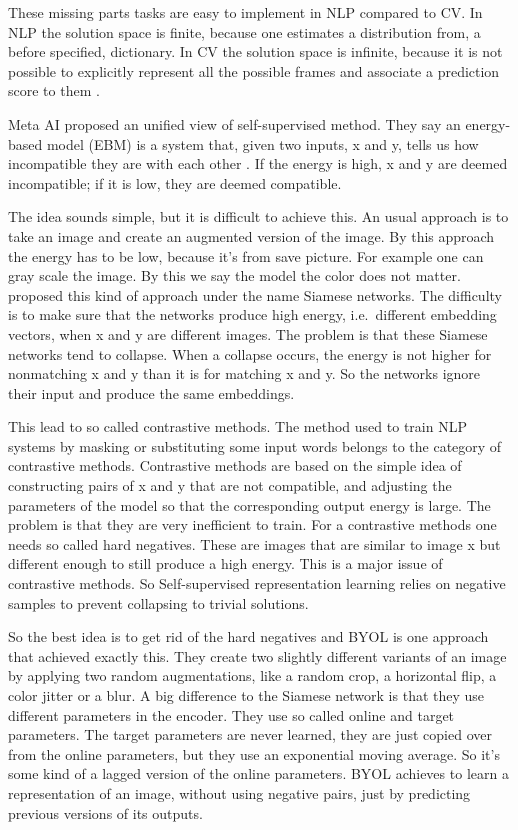 \documentclass[
]{krantz}
\begin{document}
These missing parts tasks are easy to implement in NLP compared to CV. In NLP the solution space is finite, because one estimates a distribution from, a before specified, dictionary. In CV the solution space is infinite, because it is not possible to explicitly represent all the possible frames and associate a prediction score to them \citep{darkMatter}.

Meta AI proposed an unified view of self-supervised method. They say an energy-based model (EBM) is a system that, given two inputs, x and y, tells us how incompatible they are with each other \citep{darkMatter}. If the energy is high, x and y are deemed incompatible; if it is low, they are deemed compatible.

The idea sounds simple, but it is difficult to achieve this. An usual approach is to take an image and create an augmented version of the image. By this approach the energy has to be low, because it's from save picture. For example one can gray scale the image. By this we say the model the color does not matter. \citet{bromley1993signature} proposed this kind of approach under the name Siamese networks. The difficulty is to make sure that the networks produce high energy, i.e.~different embedding vectors, when x and y are different images. The problem is that these Siamese networks tend to collapse. When a collapse occurs, the energy is not higher for nonmatching x and y than it is for matching x and y. So the networks ignore their input and produce the same embeddings.

This lead to so called contrastive methods. The method used to train NLP systems by masking or substituting some input words belongs to the category of contrastive methods. Contrastive methods are based on the simple idea of constructing pairs of x and y that are not compatible, and adjusting the parameters of the model so that the corresponding output energy is large. The problem is that they are very inefficient to train. For a contrastive methods one needs so called hard negatives. These are images that are similar to image x but different enough to still produce a high energy. This is a major issue of contrastive methods. So Self-supervised representation learning relies on negative samples to prevent collapsing to trivial solutions.

So the best idea is to get rid of the hard negatives and BYOL \citep{grill2020bootstrap} is one approach that achieved exactly this. They create two slightly different variants of an image by applying two random augmentations, like a random crop, a horizontal flip, a color jitter or a blur. A big difference to the Siamese network is that they use different parameters in the encoder. They use so called online and target parameters. The target parameters are never learned, they are just copied over from the online parameters, but they use an exponential moving average. So it's some kind of a lagged version of the online parameters. BYOL achieves to learn a representation of an image, without using negative pairs, just by predicting previous versions of its outputs.
\end{document}
